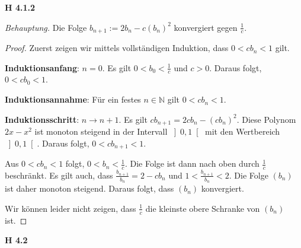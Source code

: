 \documentclass[12pt]{extarticle}
\begin{document}
\textbf{H 4.1.2}

\textit{Behauptung.}   Die Folge \(b_{n+1}:= 2b_n - c(b_n)^2\)
konvergiert gegen \(\frac{1}{c}\).

\begin{proof}

Zuerst zeigen wir mittels vollständigen Induktion, dass \(0< cb_n<1\)
gilt.

\textbf{Induktionsanfang}: \(n=0\).
Es gilt \(0 < b_0 < \frac{1}{c}\) und \(c > 0\).  Daraus folgt, $0 < c b_0
< 1$.

\textbf{Induktionsannahme}: Für ein festes \(n \in \mathbb{N}\) gilt $0
< cb_n < 1$.

\textbf{Induktionsschritt}: \(n \rightarrow n+1\).
Es gilt \(cb_{n+1}=2cb_n-(cb_n)^2\).  Diese Polynom \(2x - x^2\) ist
monoton steigend in der Intervall \(\left] 0, 1\right[\) mit den
Wertbereich \(\left] 0, 1\right[\).  Daraus folgt, $0
< cb_{n+1} < 1$.

\vspace{3mm}

Aus \(0 < cb_n < 1\) folgt, \(0 < b_n < \frac{1}{c}\).  Die Folge ist dann
nach oben durch \(\frac{1}{c}\) beschränkt.  Es gilt auch, dass
\(\frac{b_{n+1}}{b_n}=2-cb_n\) und \(1 < \frac{b_{n+1}}{b_n} < 2\).  Die
Folge \((b_n)\) ist daher monoton steigend.  Daraus folgt, dass \((b_n)\)
konvergiert.

Wir können leider nicht zeigen, dass \(\frac{1}{c}\) die kleinste obere
Schranke von \((b_n)\) ist.
\end{proof}

\textbf{H 4.2}
\end{document}
